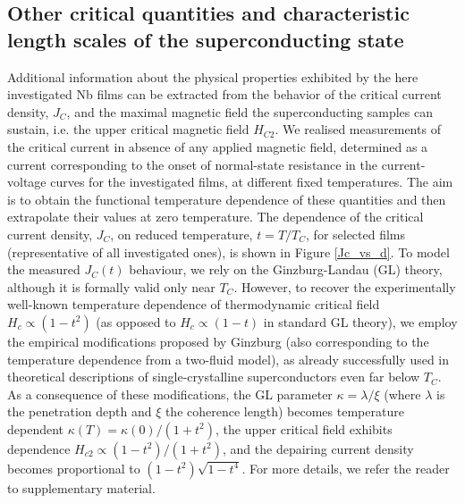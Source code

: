 \documentclass[reprint,onecolumn,superscriptaddress,a4paper,nofootinbib,floatfix]{revtex4-1}
\begin{document}
\subsection*{Other critical quantities and characteristic length scales of the superconducting state}

Additional information about the physical properties exhibited by the here investigated Nb films can be extracted from the behavior of the critical current density, $J_C$, and the maximal magnetic field the superconducting samples can sustain, i.e. the upper critical magnetic field $H_{C2}$.
We realised measurements of the critical current in absence of any applied magnetic field, determined as a current corresponding to the onset of normal-state resistance in the current-voltage curves for the investigated films, at different fixed temperatures. The aim is to obtain the functional temperature dependence of these quantities and then extrapolate their values at zero temperature. The dependence of the critical current density, $J_C$, on reduced temperature, $t = T/T_C$, for selected films (representative of all investigated ones), is shown in Figure \ref{Jc_vs_d}. 
To model the measured $J_C(t)$ behaviour, we rely on the Ginzburg-Landau (GL) theory, although it is formally valid only near $T_C$. However, to recover the experimentally well-known temperature dependence of thermodynamic critical field $H_c\propto(1-t^2)$ (as opposed to $H_c\propto(1-t)$ in standard GL theory), we employ the empirical modifications proposed by Ginzburg\cite{Ginzburg1956} (also corresponding to the temperature dependence from a two-fluid model), as already successfully used in theoretical descriptions of single-crystalline superconductors even far below $T_C$.\cite{Muller2012} As a consequence of these modifications, the GL parameter $\kappa=\lambda/\xi$ (where $\lambda$ is the penetration depth and $\xi$ the coherence length) becomes temperature dependent $\kappa(T)=\kappa(0)\big/(1+t^2)$, the upper critical field exhibits dependence $H_{c2}\propto(1-t^2)\big/(1+t^2)$, and the depairing current density becomes proportional to $\left(1-t^2\right)\sqrt{1-t^4}$. For more details, we refer the reader to supplementary material.
\end{document}
